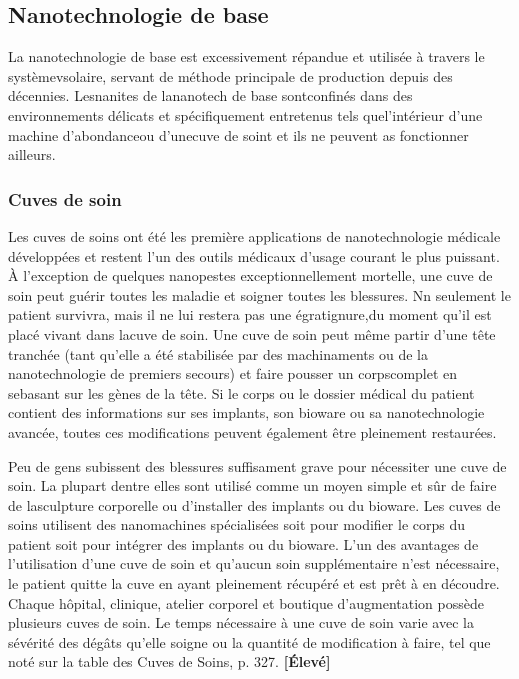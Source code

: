 \subsection{Nanotechnologie de base} \label{sec:basic-nanotech} 

La nanotechnologie de base est excessivement répandue et utilisée à travers le systèmevsolaire, servant de méthode principale de production depuis des décennies. Lesnanites de lananotech de base sontconfinés dans des environnements délicats et spécifiquement entretenus tels quel'intérieur d'une machine d'abondanceou d'unecuve de soint et ils ne peuvent as fonctionner ailleurs. 

\subsubsection{Cuves de soin} 

Les cuves de soins ont été les première applications de nanotechnologie médicale développées et restent l'un des outils médicaux d'usage courant le plus puissant. À l'exception de quelques nanopestes exceptionnellement mortelle, une cuve de soin peut guérir toutes les maladie et soigner toutes les blessures. Nn seulement le patient survivra, mais il ne lui restera pas une égratignure,du moment qu'il est placé vivant dans lacuve de soin. Une cuve de soin peut même partir d'une tête tranchée (tant qu'elle a été stabilisée par des machinaments ou de la nanotechnologie de premiers secours) et faire pousser un corpscomplet en sebasant sur les gènes de la tête. Si le corps ou le dossier médical du patient contient des informations sur ses implants, son bioware ou sa nanotechnologie avancée, toutes ces modifications peuvent également être pleinement restaurées. 

Peu de gens subissent des blessures suffisament grave pour nécessiter une cuve de soin. La plupart dentre elles sont utilisé comme un moyen simple et sûr de faire de lasculpture corporelle ou d'installer des implants ou du bioware. Les cuves de soins utilisent des nanomachines spécialisées soit pour modifier le corps du patient soit pour intégrer des implants ou du bioware. L'un des avantages de l'utilisation d'une cuve de soin et qu'aucun soin supplémentaire n'est nécessaire, le patient quitte la cuve en ayant pleinement récupéré et est prêt à en découdre. Chaque hôpital, clinique, atelier corporel et boutique d'augmentation possède plusieurs cuves de soin. Le temps nécessaire à une cuve de soin varie avec la sévérité des dégâts qu'elle soigne ou la quantité de modification à faire, tel que noté sur la table des Cuves de Soins, p. 327. \textbf{[Élevé]} 

